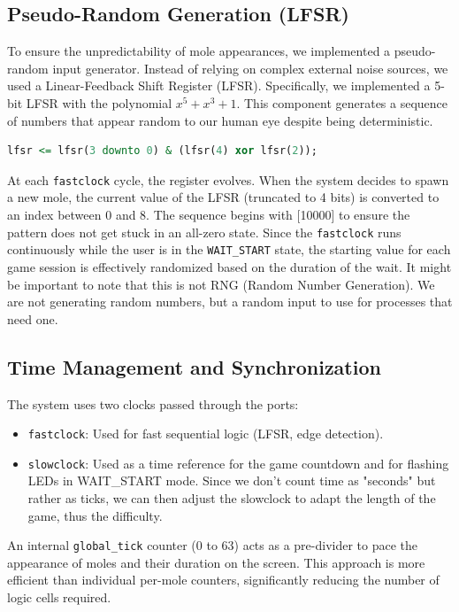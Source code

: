 \documentclass[12pt,a4paper]{article}
\begin{document}
\subsection{Pseudo-Random Generation (LFSR)}
To ensure the unpredictability of mole appearances, we implemented a pseudo-random input generator. Instead of relying on complex external noise sources, we used a Linear-Feedback Shift Register (LFSR). Specifically, we implemented a 5-bit LFSR with the polynomial $x^5 + x^3 + 1$. This component generates a sequence of numbers that appear random to our human eye despite being deterministic.
\begin{lstlisting}[language=VHDL]
lfsr <= lfsr(3 downto 0) & (lfsr(4) xor lfsr(2));
\end{lstlisting}

At each \texttt{fastclock} cycle, the register evolves. When the system decides to spawn a new mole, the current value of the LFSR (truncated to 4 bits) is converted to an index between 0 and 8. The sequence begins with [10000] to ensure the pattern does not get stuck in an all-zero state. Since the \texttt{fastclock} runs continuously while the user is in the \texttt{WAIT\_START} state, the starting value for each game session is effectively randomized based on the duration of the wait. It might be important to note that this is not RNG (Random Number Generation). We are not generating random numbers, but a random input to use for processes that need one. 

\subsection{Time Management and Synchronization}
The system uses two clocks passed through the ports:
\begin{itemize}
    \item \texttt{fastclock}: Used for fast sequential logic (LFSR, edge detection).
    \item \texttt{slowclock}: Used as a time reference for the game countdown and for flashing LEDs in WAIT\_START mode. Since we don't count time as "seconds" but rather as ticks, we can then adjust the slowclock to adapt the length of the game, thus the difficulty. 
\end{itemize}
An internal \texttt{global\_tick} counter (0 to 63) acts as a pre-divider to pace the appearance of moles and their duration on the screen. This approach is more efficient than individual per-mole counters, significantly reducing the number of logic cells required.
\end{document}
